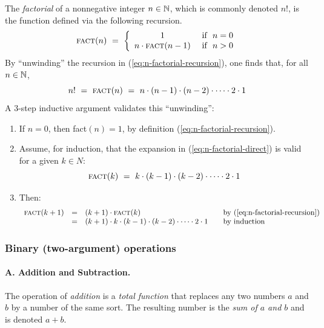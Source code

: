 %
The {\it factorial} of a nonnegative integer $n \in \mathbb{N}$, which is
commonly denoted $n!$,
is the function defined via the following recursion.
\begin{equation}
\label{eq:n-factorial-recursion}
\mbox{\sc fact}(n) \ = \ \left\{
\begin{array}{cl}
1 & \mbox{  if } \ n=0 \\
n \cdot \mbox{\sc fact}(n-1) & \mbox{  if } \ n>0
\end{array}
\right.
\end{equation}
By ``unwinding'' the recursion in (\ref{eq:n-factorial-recursion}),
one finds that, for all $n \in \mathbb{N}$,
\begin{equation}
\label{eq:n-factorial-direct}
n! \ = \ \mbox{\sc fact}(n) \ = \ 
n \cdot (n-1) \cdot (n-2) \cdot \cdots \cdot 2 \cdot 1
\end{equation} 
A $3$-step inductive argument validates this ``unwinding'':
\begin{enumerate}
\item
If $n =0$, then {\sc fact}$(n) = 1$, by definition
(\ref{eq:n-factorial-recursion}).
\item
Assume, for induction, that the expansion in
(\ref{eq:n-factorial-direct}) is valid for a given $k \in N$:
\[ \mbox{\sc fact}(k) \ = \ k \cdot (k-1) \cdot (k-2) \cdot \cdots
\cdot 2 \cdot 1 \] 
\item
Then:
\[
\begin{array}{lclll}
\mbox{\sc fact}(k+1) & = & (k+1) \cdot \mbox{\sc fact}(k)
  & & \mbox{by (\ref{eq:n-factorial-recursion})} \\
  & = &
(k+1) \cdot k \cdot (k-1) \cdot (k-2) \cdot \cdots \cdot 2 \cdot 1
  & & \mbox{by induction}
\end{array}
\]
\end{enumerate}


\subsubsection{Binary (two-argument) operations}
\label{sec:binary-operators}

\paragraph{\small\sf A. Addition and Subtraction.}
%
The operation of {\it addition} is a {\em
  total function} that replaces any two numbers $a$ and $b$ by a
number of the same sort.  The resulting number is the {\em sum of $a$
  and $b$}\index{arithmetic!addition!sum} and is denoted $a+b$.

